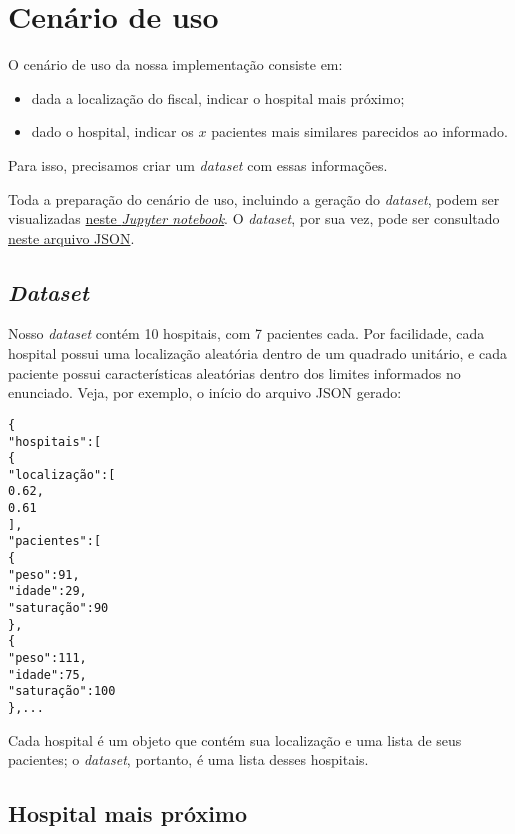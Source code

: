 \section{Cenário de uso}

    O cenário de uso da nossa implementação consiste em:
    \begin{itemize}
        \item dada a localização do fiscal, indicar o hospital mais próximo;
        \item dado o hospital, indicar os $x$ pacientes mais similares parecidos ao informado.
    \end{itemize}
    Para isso, precisamos criar um \textit{dataset} com essas informações.

    Toda a preparação do cenário de uso, incluindo a geração do \textit{dataset}, podem ser visualizadas \href{https://nbviewer.jupyter.org/github/lucasresck/data-structures-algorithms/blob/main/notebooks/k_d_tree.ipynb}{neste \textit{Jupyter notebook}}. O \textit{dataset}, por sua vez, pode ser consultado \href{https://github.com/lucasresck/data-structures-algorithms/blob/main/data/hospitals.json}{neste arquivo JSON}.

    \subsection{\textit{Dataset}}

        Nosso \textit{dataset} contém 10 hospitais, com 7 pacientes cada. Por facilidade, cada hospital possui uma localização aleatória dentro de um quadrado unitário, e cada paciente possui características aleatórias dentro dos limites informados no enunciado.
        Veja, por exemplo, o início do arquivo JSON gerado:
        \begin{alltt}
\{
    "hospitais": [
        \{
            "localização": [
                0.62,
                0.61
            ],
            "pacientes": [
                \{
                    "peso": 91,
                    "idade": 29,
                    "saturação": 90
                \},
                \{
                    "peso": 111,
                    "idade": 75,
                    "saturação": 100
                \}, ...
        \end{alltt}
        Cada hospital é um objeto que contém sua localização e uma lista de seus pacientes; o \textit{dataset}, portanto, é uma lista desses hospitais.

    \subsection{Hospital mais próximo}

